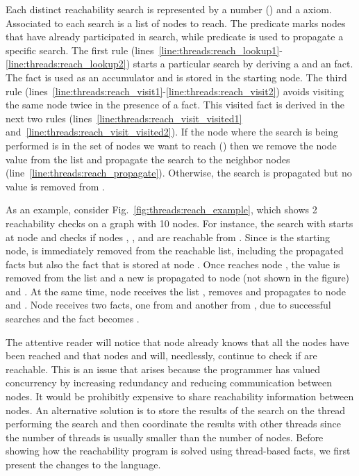 Each distinct reachability search is represented by a number () and a
 axiom. Associated to each search  is a list of nodes to
reach.  The predicate  marks nodes that have already
participated in search, while predicate  is used to propagate a
specific search. The first rule
(lines~\ref{line:threads:reach_lookup1}-\ref{line:threads:reach_lookup2}) starts
a particular search by deriving a  and an  fact.
The  fact is used as an accumulator and is stored in the starting
node. The third rule
(lines~\ref{line:threads:reach_visit1}-\ref{line:threads:reach_visit2}) avoids
visiting the same node twice in the presence of a  fact.  This
visited fact is derived in the next two rules
(lines~\ref{line:threads:reach_visit_visited1}
and~\ref{line:threads:reach_visit_visited2}).  If the node where the search is
being performed is in the set of nodes we want to reach () then we
remove the node value from the list and propagate the search to the neighbor
nodes (line~\ref{line:threads:reach_propagate}).  Otherwise, the search is
propagated but no value is removed from .

As an example, consider Fig.~\ref{fig:threads:reach_example}, which shows 2
reachability checks on a graph with 10 nodes. For instance, the search with
 starts at node  and checks if nodes , ,
and  are reachable from . Since  is the starting
node,  is immediately removed from the reachable list, including the
propagated  facts but also the  fact that is stored
at node . Once  reaches node , the value
 is removed from the list and a new  is propagated to
node  (not shown in the figure) and . At the same time, node
 receives the list \code{[2,3]}, removes  and propagates
\code{[3]} to node  and . Node  receives two
 facts, one from  and another from , due to
successful searches and the  fact becomes .

The attentive reader will notice that node  already knows that all the
nodes have been reached and that nodes  and  will, needlessly,
continue to check if \code{[2,3]} are reachable. This is an issue that arises
because the programmer has valued concurrency by increasing redundancy and
reducing communication between nodes. It would be prohibitly expensive to share
reachability information between nodes. An alternative solution is to store the
results of the search on the thread performing the search and then coordinate
the results with other threads since the number of threads is usually smaller
than the number of nodes. Before showing how the reachability program is solved
using thread-based facts, we first present the changes to the language.

